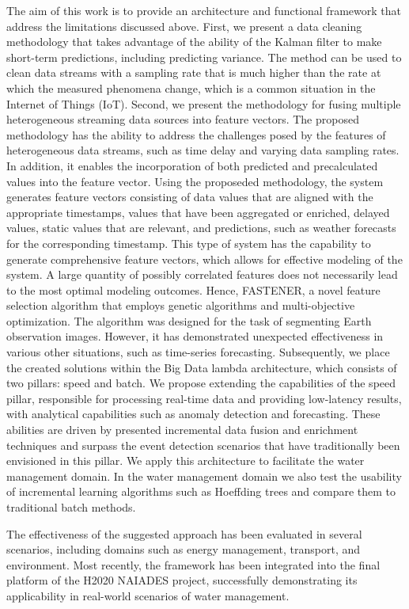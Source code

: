 The aim of this work is to provide an architecture and functional framework that address the limitations discussed above.
First, we present a data cleaning methodology that takes advantage of the ability of the Kalman filter to make short-term predictions, including predicting variance.
The method can be used to clean data streams with a sampling rate that is much higher than the rate at which the measured phenomena change, which is a common situation in the Internet of Things (IoT).
Second, we present the methodology for fusing multiple heterogeneous streaming data sources into feature vectors.
The proposed methodology has the ability to address the challenges posed by the features of heterogeneous data streams, such as time delay and varying data sampling rates.
In addition, it enables the incorporation of both predicted and precalculated values into the feature vector.
Using the proposeded methodology, the system generates feature vectors consisting of data values that are aligned with the appropriate timestamps, values that have been aggregated or enriched, delayed values, static values that are relevant, and predictions, such as weather forecasts for the corresponding timestamp.
This type of system has the capability to generate comprehensive feature vectors, which allows for effective modeling of the system.
A large quantity of possibly correlated features does not necessarily lead to the most optimal modeling outcomes. 
Hence, FASTENER, a novel feature selection algorithm that employs genetic algorithms and multi-objective optimization.
The algorithm was designed for the task of segmenting Earth observation images. 
However, it has demonstrated unexpected effectiveness in various other situations, such as time-series forecasting.
Subsequently, we place the created solutions within the Big Data lambda architecture, which consists of two pillars: speed and batch.
We propose extending the capabilities of the speed pillar, responsible for processing real-time data and providing low-latency results, with analytical capabilities such as anomaly detection and forecasting.
These abilities are driven by presented incremental data fusion and enrichment techniques and surpass the event detection scenarios that have traditionally been envisioned in this pillar.
We apply this architecture to facilitate the water management domain.
In the water management domain we also test the usability of incremental learning algorithms such as Hoeffding trees and compare them to traditional batch methods.

The effectiveness of the suggested approach has been evaluated in several scenarios, including domains such as energy management, transport, and environment. 
Most recently, the framework has been integrated into the final platform of the H2020 NAIADES project, successfully demonstrating its applicability in real-world scenarios of water management.